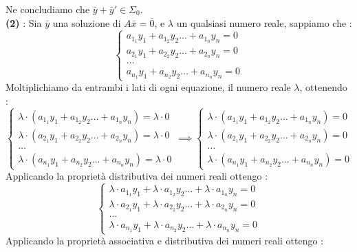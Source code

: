 \documentclass[12pt, letterpaper]{article}
\begin{document}
Ne concludiamo che \(\bar y +\bar y' \in \Sigma_0\).\\ 
\textbf{(2) }: 
Sia \(\bar y\) una soluzione di \(A\bar x = \bar 0\), e \(\lambda\) un qualsiasi numero reale, sappiamo che :\begin{equation}
    \begin{cases}
        a_{1_1}y_1+a_{1_2}y_2\dots+a_{1_n}y_n=0\\
        a_{2_1}y_1+a_{2_2}y_2\dots+a_{2_n}y_n=0\\\dots\\ 
        a_{n_1}y_1+a_{n_2}y_2\dots+a_{n_n}y_n=0
    \end{cases}
\end{equation}
Moltiplichiamo da entrambi i lati di ogni equazione, il numero reale \(\lambda\), ottenendo : \begin{equation}
    \begin{cases}
        \lambda\cdot(a_{1_1}y_1+a_{1_2}y_2\dots+a_{1_n}y_n)=\lambda\cdot0\\
        \lambda\cdot(a_{2_1}y_1+a_{2_2}y_2\dots+a_{2_n}y_n)=\lambda\cdot0\\\dots\\ 
        \lambda\cdot(a_{n_1}y_1+a_{n_2}y_2\dots+a_{n_n}y_n)=\lambda\cdot0
    \end{cases}\implies \begin{cases}
        \lambda\cdot(a_{1_1}y_1+a_{1_2}y_2\dots+a_{1_n}y_n)=0\\
        \lambda\cdot(a_{2_1}y_1+a_{2_2}y_2\dots+a_{2_n}y_n)=0\\\dots\\ 
        \lambda\cdot(a_{n_1}y_1+a_{n_2}y_2\dots+a_{n_n}y_n)=0
    \end{cases}
\end{equation}
Applicando la proprietà distributiva dei numeri reali ottengo : \begin{equation}
    \begin{cases}
        \lambda\cdot a_{1_1}y_1+ \lambda\cdot a_{1_2}y_2\dots+ \lambda\cdot a_{1_n}y_n=0\\
        \lambda\cdot a_{2_1}y_1+ \lambda\cdot a_{2_2}y_2\dots+ \lambda\cdot a_{2_n}y_n=0\\\dots\\ 
        \lambda\cdot a_{n_1}y_1+ \lambda\cdot a_{n_2}y_2\dots+ \lambda\cdot a_{n_n}y_n=0
    \end{cases}
\end{equation}
Applicando la proprietà associativa e distributiva dei numeri reali ottengo : 
\end{document}
